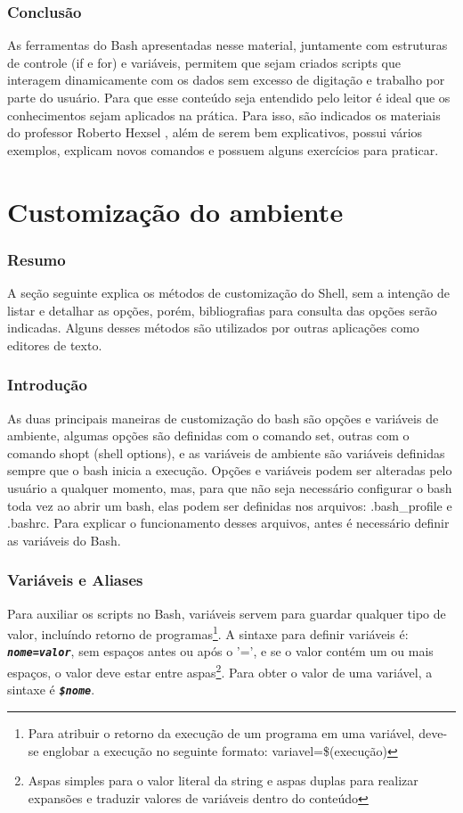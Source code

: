 \documentclass[oneside, 11 pt]{article}
\begin{document}
	\section{Conclusão}
	As ferramentas do Bash apresentadas nesse material, juntamente com estruturas de controle
	(if e for) e variáveis, permitem que sejam criados scripts que interagem dinamicamente com
	os dados sem excesso de digitação e trabalho por parte do usuário. Para que esse conteúdo
	seja entendido pelo leitor é ideal que os conhecimentos sejam aplicados na prática. Para isso,
	são indicados os materiais do professor Roberto Hexsel \cite{roberto1, roberto2}, além
	de serem bem explicativos, possui vários exemplos, explicam novos comandos e possuem
	alguns exercícios para praticar.
	
	\newpage
	\part{Customização do ambiente}
	\section{Resumo}
	A seção seguinte explica os métodos de customização do Shell, sem a intenção de listar e detalhar as opções, porém, bibliografias para consulta das opções serão indicadas. Alguns desses métodos são utilizados por outras aplicações como editores de texto.
	
	\section{Introdução}
	As duas principais maneiras de customização do bash são opções e variáveis de ambiente, algumas opções são definidas com o comando set, outras com o comando shopt (shell options), e as variáveis de ambiente são variáveis definidas sempre que o bash inicia a execução. Opções e variáveis podem ser alteradas pelo usuário a qualquer momento, mas, para que não seja necessário configurar o bash toda vez ao abrir um bash, elas podem ser definidas nos arquivos: .bash\_profile e .bashrc. Para explicar o funcionamento desses arquivos, antes é necessário definir as variáveis do Bash.
	
	\section{Variáveis e Aliases}
	Para auxiliar os scripts no Bash, variáveis servem para guardar qualquer tipo de valor, incluíndo retorno de programas\footnote[1]{Para atribuir o retorno da execução de um programa em uma variável, deve-se englobar a execução no seguinte formato: variavel=\$(execução)}. A sintaxe para definir variáveis é: \texttt{\textbf{\textit{nome=valor}}}, sem espaços antes ou após o '=', e se o valor contém um ou mais espaços, o valor deve estar entre aspas\footnote[2]{Aspas simples para o valor literal da string e aspas duplas para realizar expansões e traduzir valores de variáveis dentro do conteúdo}. Para obter o valor de uma variável, a sintaxe é \texttt{\textbf{\textit{\$nome}}}.
	
\end{document}

